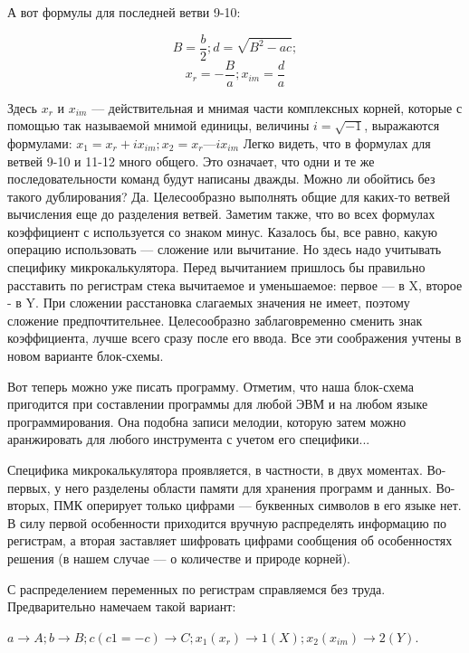 \documentclass[11pt,a4paper,oneside]{article}
\begin{document}
А вот формулы для последней ветви 9-10:

\begin{equation}
B=\frac{b}{2}; d=\sqrt{B^{2}-ac};
\end{equation}
\begin{equation}
x_{r}=-\frac{B}{a}; x_{im}=\frac{d}{a}
\end{equation}

Здесь $x_{r}$ и $x_{im}$ — действительная и мнимая части комплексных корней, которые с помощью так называемой мнимой единицы, величины $i=\sqrt{-1}$, выражаются формулами:
$x_{1}=x_{r} + ix_{im}; x_{2} = x_{r} — ix_{im}$ Легко видеть, что в формулах для ветвей 9-10 и 11-12 много общего. Это означает, что одни и те же последовательности команд будут написаны дважды. Можно ли обойтись без такого дублирования? Да. Целесообразно выполнять общие для каких-то ветвей вычисления еще до разделения ветвей. Заметим также, что во всех формулах коэффициент с используется со знаком минус. Казалось бы, все равно, какую операцию использовать — сложение или вычитание. Но здесь надо учитывать специфику микрокалькулятора. Перед вычитанием пришлось бы правильно расставить по регистрам стека вычитаемое и уменьшаемое: первое — в X, второе - в Y. При сложении расстановка слагаемых значения не имеет, поэтому сложение предпочтительнее. Целесообразно заблаговременно сменить знак коэффициента, лучше всего сразу после его ввода. Все эти соображения учтены в новом варианте блок-схемы.

Вот теперь можно уже писать программу. Отметим, что наша блок-схема пригодится при составлении программы для любой ЭВМ и на любом языке программирования. Она подобна записи мелодии, которую затем можно аранжировать для любого инструмента с учетом его специфики...

Специфика микрокалькулятора проявляется, в частности, в двух моментах. Во-первых, у него разделены области памяти для хранения программ и данных. Во-вторых, ПМК оперирует только цифрами — буквенных символов в его языке нет. В силу первой особенности приходится вручную распределять информацию по регистрам, а вторая заставляет шифровать цифрами сообщения об особенностях решения (в нашем случае — о количестве и природе корней).

С распределением переменных по регистрам справляемся без труда. Предварительно намечаем такой вариант:

$a \rightarrow A; b \rightarrow B; c (c1 = -c) \rightarrow C;
x_{1} (x_{r}) \rightarrow 1(X); x_{2}(x_{im}) \rightarrow 2(Y)$.
\end{document}
